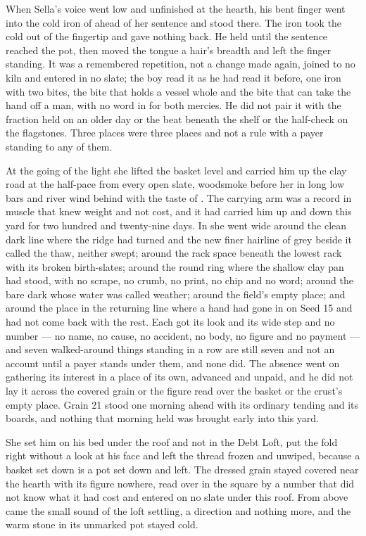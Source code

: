 When Sella's voice went low and unfinished at the hearth, his bent finger went into the cold iron of  ahead of her sentence and stood there. The iron took the cold out of the fingertip and gave nothing back. He held until the sentence reached the pot, then moved the tongue a hair's breadth and left the finger standing. It was a remembered repetition, not a change made again, joined to no kiln and entered in no slate; the boy read it as he had read it before, one iron with two bites, the bite that holds a vessel whole and the bite that can take the hand off a man, with no word in  for both mercies. He did not pair it with the fraction held on an older day or the beat beneath the shelf or the half-check on the flagstones. Three places were three places and not a rule with a payer standing to any of them.

\scenebreak

At the going of the light she lifted the basket level and carried him up the clay road at the half-pace from every open slate, woodsmoke before her in long low bars and river wind behind with the taste of . The carrying arm was a record in muscle that knew weight and not cost, and it had carried him up and down this yard for two hundred and twenty-nine days. In  she went wide around the clean dark line where the ridge had turned and the new finer hairline of grey beside it called the thaw, neither swept; around the rack space beneath the lowest rack with its broken birth-slates; around the round ring where the shallow clay pan had stood, with no scrape, no crumb, no print, no chip and no word; around the bare dark  whose water was called weather; around the field's empty place; and around the place in the returning line where a hand had gone in on Seed 15 and had not come back with the rest. Each got its look and its wide step and no number --- no name, no cause, no accident, no body, no figure and no payment --- and seven walked-around things standing in a row are still seven and not an account until a payer stands under them, and none did. The absence went on gathering its interest in a place of its own, advanced and unpaid, and he did not lay it across the covered grain or the figure read over the basket or the crust's empty place. Grain 21 stood one morning ahead with its ordinary tending and its boards, and nothing that morning held was brought early into this yard.

She set him on his bed under the roof and not in the Debt Loft, put the fold right without a look at his face and left the thread frozen and unwiped, because a basket set down is a pot set down and left. The dressed grain stayed covered near the hearth with its figure nowhere, read over in the square by a number that did not know what it had cost and entered on no slate under this roof. From above came the small sound of the loft settling, a direction and nothing more, and the warm stone in its unmarked pot stayed cold.

